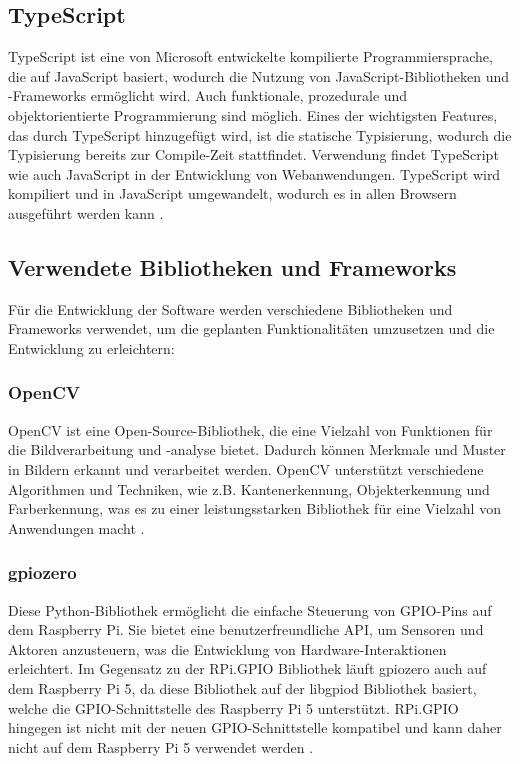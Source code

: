     \subsection{TypeScript} %
    TypeScript ist eine von Microsoft entwickelte kompilierte Programmiersprache, die auf JavaScript basiert, wodurch die Nutzung von JavaScript-Bibliotheken und -Frameworks ermöglicht wird. Auch funktionale, prozedurale und objektorientierte Programmierung sind möglich. Eines der wichtigsten Features, das durch TypeScript hinzugefügt wird, ist die statische Typisierung, wodurch die Typisierung bereits zur Compile-Zeit stattfindet. Verwendung findet TypeScript wie auch JavaScript in der Entwicklung von Webanwendungen. TypeScript wird kompiliert und in JavaScript umgewandelt, wodurch es in allen Browsern ausgeführt werden kann \cite{HandbookTypeScriptHandbook}.

    \subsection{Verwendete Bibliotheken und Frameworks}
    Für die Entwicklung der Software werden verschiedene Bibliotheken und Frameworks verwendet, um die geplanten Funktionalitäten umzusetzen und die Entwicklung zu erleichtern:
        \subsubsection{OpenCV} OpenCV ist eine Open-Source-Bibliothek, die eine Vielzahl von Funktionen für die Bildverarbeitung und -analyse bietet. Dadurch können Merkmale und Muster in Bildern erkannt und verarbeitet werden. OpenCV unterstützt verschiedene Algorithmen und Techniken, wie z.B. Kantenerkennung, Objekterkennung und Farberkennung, was es zu einer leistungsstarken Bibliothek für eine Vielzahl von Anwendungen macht \cite{OpenCVIntroduction}.
        \subsubsection{gpiozero} Diese Python-Bibliothek ermöglicht die einfache Steuerung von \ac{GPIO}-Pins auf dem Raspberry Pi. Sie bietet eine benutzerfreundliche \ac{API}, um Sensoren und Aktoren anzusteuern, was die Entwicklung von Hardware-Interaktionen erleichtert. Im Gegensatz zu der RPi.GPIO Bibliothek läuft gpiozero auch auf dem Raspberry Pi 5, da diese Bibliothek auf der libgpiod Bibliothek basiert, welche die \ac{GPIO}-Schnittstelle des Raspberry Pi 5 unterstützt. RPi.GPIO hingegen ist nicht mit der neuen \ac{GPIO}-Schnittstelle kompatibel und kann daher nicht auf dem Raspberry Pi 5 verwendet werden \cite{GpiozeroGpiozero201}.
